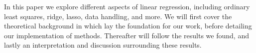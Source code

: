 In this paper we explore different aspects of linear regression, including ordinary least squares, ridge, lasso, data handling, and more. 
We will first cover the theoretical background in which lay the foundation for our work, before detailing our implementation of methods. 
Thereafter will follow the results we found, and lastly an interpretation and discussion surrounding these results. 

